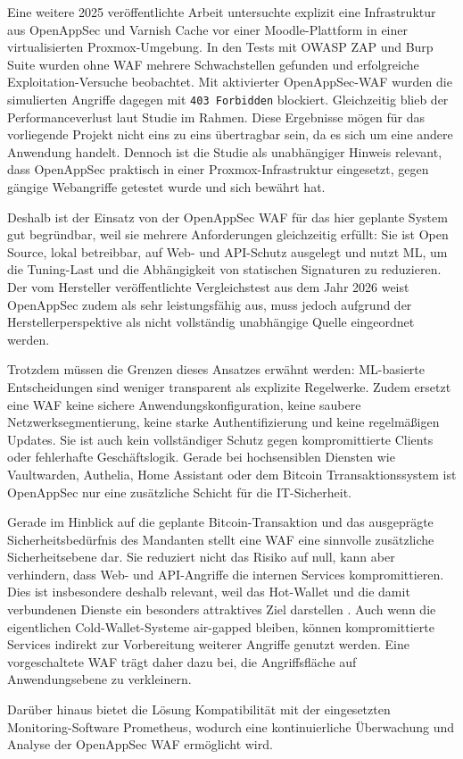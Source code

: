Eine weitere 2025 veröffentlichte Arbeit untersuchte explizit eine Infrastruktur aus OpenAppSec und Varnish Cache vor einer Moodle-Plattform in einer virtualisierten Proxmox-Umgebung. In den Tests mit \acs{OWASP} \ac{ZAP} und Burp Suite wurden ohne \ac{WAF} mehrere Schwachstellen gefunden und erfolgreiche Exploitation-Versuche beobachtet. Mit aktivierter OpenAppSec-\ac{WAF} wurden die simulierten Angriffe dagegen mit \texttt{403 Forbidden} blockiert. Gleichzeitig blieb der Performanceverlust laut Studie im Rahmen. Diese Ergebnisse mögen für das vorliegende Projekt nicht eins zu eins übertragbar sein, da es sich um eine andere Anwendung handelt. Dennoch ist die Studie als unabhängiger Hinweis relevant, dass OpenAppSec praktisch in einer Proxmox-Infrastruktur eingesetzt, gegen gängige Webangriffe getestet wurde und sich bewährt hat. \cite{alimran_2025_openappsec}

Deshalb ist der Einsatz von der OpenAppSec \acs{WAF} für das hier geplante System gut begründbar, weil sie mehrere Anforderungen gleichzeitig erfüllt: Sie ist Open Source, lokal betreibbar, auf Web- und \ac{API}-Schutz ausgelegt und nutzt \ac{ML}, um die Tuning-Last und die Abhängigkeit von statischen Signaturen zu reduzieren. Der vom Hersteller veröffentlichte Vergleichstest aus dem Jahr 2026 weist OpenAppSec zudem als sehr leistungsfähig aus, muss jedoch aufgrund der Herstellerperspektive als nicht vollständig unabhängige Quelle eingeordnet werden. \cite{openappsec_waf_comparison_2026}

Trotzdem müssen die Grenzen dieses Ansatzes erwähnt werden: \acs{ML}-basierte Entscheidungen sind weniger transparent als explizite Regelwerke. Zudem ersetzt eine \ac{WAF} keine sichere Anwendungskonfiguration, keine saubere Netzwerksegmentierung, keine starke Authentifizierung und keine regelmäßigen Updates. Sie ist auch kein vollständiger Schutz gegen kompromittierte Clients oder fehlerhafte Geschäftslogik. Gerade bei hochsensiblen Diensten wie Vaultwarden, Authelia, Home Assistant oder dem Bitcoin Trransaktionssystem ist OpenAppSec nur eine zusätzliche Schicht für die IT-Sicherheit.

Gerade im Hinblick auf die geplante Bitcoin-Transaktion und das ausgeprägte Sicherheitsbedürfnis des Mandanten stellt eine \acl{WAF} eine sinnvolle zusätzliche Sicherheitsebene dar. Sie reduziert nicht das Risiko auf null, kann aber verhindern, dass Web- und \ac{API}-Angriffe die internen Services kompromittieren. Dies ist insbesondere deshalb relevant, weil das Hot-Wallet und die damit verbundenen Dienste ein besonders attraktives Ziel darstellen \cite{chainalysis_crypto_crime_2025}. Auch wenn die eigentlichen Cold-Wallet-Systeme air-gapped bleiben, können kompromittierte Services indirekt zur Vorbereitung weiterer Angriffe genutzt werden. Eine vorgeschaltete \ac{WAF} trägt daher dazu bei, die Angriffsfläche auf Anwendungsebene zu verkleinern.

Darüber hinaus bietet die Lösung Kompatibilität mit der eingesetzten Monitoring-Software Prometheus, wodurch eine kontinuierliche Überwachung und Analyse der OpenAppSec \acs{WAF} ermöglicht wird. \cite{openappsec_prometheus}


